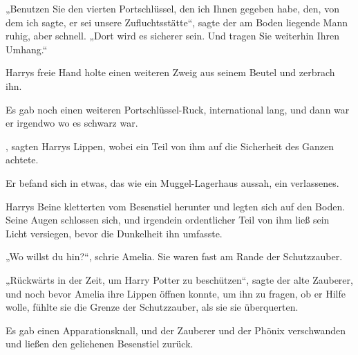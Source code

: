 „Benutzen Sie den vierten Portschlüssel, den ich Ihnen gegeben habe, den, von dem ich sagte, er sei unsere Zufluchtsstätte“, sagte der am Boden liegende Mann ruhig, aber schnell.
„Dort wird es sicherer sein. Und tragen Sie weiterhin Ihren Umhang.“

Harrys freie Hand holte einen weiteren Zweig aus seinem Beutel und zerbrach ihn.

Es gab noch einen weiteren Portschlüssel-Ruck, international lang, und dann war er irgendwo wo es schwarz war.

, sagten Harrys Lippen, wobei ein Teil von ihm auf die Sicherheit des Ganzen achtete.

Er befand sich in etwas, das wie ein Muggel-Lagerhaus aussah, ein verlassenes.

Harrys Beine kletterten vom Besenstiel herunter und legten sich auf den Boden. Seine Augen schlossen sich, und irgendein ordentlicher Teil von ihm ließ sein Licht versiegen, bevor die Dunkelheit ihn umfasste.

\later

„Wo willst du hin?“, schrie Amelia. Sie waren fast am Rande der Schutzzauber.

„Rückwärts in der Zeit, um Harry Potter zu beschützen“, sagte der alte Zauberer, und noch bevor Amelia ihre Lippen öffnen konnte, um ihn zu fragen, ob er Hilfe wolle, fühlte sie die Grenze der Schutzzauber, als sie sie überquerten.

Es gab einen Apparationsknall, und der Zauberer und der Phönix verschwanden und ließen den geliehenen Besenstiel zurück.

